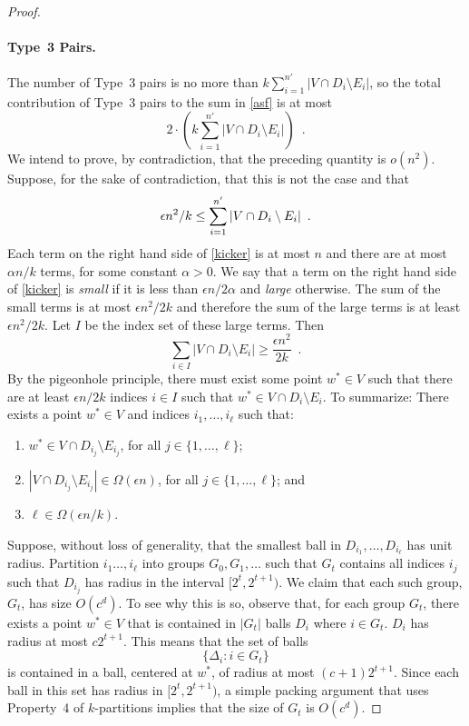\documentclass{patmorin}
\begin{document}
\begin{proof}
  \paragraph{Type~3 Pairs.}
  The number of Type~3 pairs is no more than $k\sum_{i=1}^{n'}|V\cap
  D_i\setminus E_i|$, so the total contribution of Type~3 pairs to 
  the sum in \eqref{asf} is at most
  \[
      2\cdot\left(k\sum_{i=1}^{n'} |V\cap D_i\setminus E_i|\right) \enspace .
  \]
  We intend to prove, by contradiction, that the preceding quantity
  is $o(n^2)$.  Suppose, for the sake of contradiction, that this is
  not the case and that
  \begin{equation}
    \epsilon n^2/k \le \sum_{i=1}^{n'} |V\cap D_i\setminus E_i| 
         \enspace . \eqlabel{kicker}
  \end{equation}
  Each term on the right hand side of \eqref{kicker} is at most $n$
  and there are at most $\alpha n/k$ terms, for some constant $\alpha
  >0$.  We say that a term on the right hand side of \eqref{kicker} is
  \emph{small} if it is less than $\epsilon n/2\alpha$ and \emph{large}
  otherwise.  The sum of the small terms is at most $\epsilon n^2/2k$
  and therefore the sum of the large terms is at least $\epsilon n^2/2k$.
  Let $I$ be the index set of these large terms.  Then
  \[
    \sum_{i\in I} |V\cap D_i\setminus E_i| \ge \frac{\epsilon n^2}{2k} \enspace .
  \]
  By the pigeonhole principle, there must exist some point $w^*\in V$
  such that there are at least $\epsilon n/2k$ indices $i\in I$ such
  that $w^*\in V\cap D_i\setminus E_i$.  To summarize: There exists a
  point $w^*\in V$ and indices $i_1,\ldots,i_\ell$ such that:
  \begin{enumerate}
     \item $w^*\in V\cap D_{i_j}\setminus E_{i_j}$, for all
        $j\in\{1,\ldots,\ell\}$;
     \item $|V\cap D_{i_j}\setminus E_{i_j}|\in \Omega(\epsilon n)$,
       for all $j\in\{1,\ldots,\ell\}$; and
     \item $\ell\in\Omega(\epsilon n/k)$.
  \end{enumerate}

  Suppose, without loss of generality, that the smallest ball
  in $D_{i_1},\ldots,D_{i_\ell}$ has unit radius.  Partition
  $i_1\ldots,i_\ell$ into groups $G_0,G_1,\ldots$ such that $G_t$
  contains all indices $i_j$ such that $D_{i_j}$ has radius in the
  interval $[2^t,2^{t+1})$.  We claim that each such group, $G_t$, has
  size $O(c^d)$.  To see why this is so, observe that, for each group
  $G_t$, there exists a point $w^*\in V$ that is contained in $|G_t|$
  balls $D_{i}$ where $i\in G_t$.  $D_{i}$ has radius at most $c2^{t+1}$.
  This means that the set of balls
  \[
     \{ \Delta_i : i\in G_t\}
  \]
  is contained in a ball, centered at $w^*$, of radius at most
  $(c+1)2^{t+1}$.  Since each ball in this set has radius in
  $[2^t,2^{t+1})$, a simple packing argument that uses Property~4 of
  $k$-partitions implies that the size of $G_t$ is $O(c^d)$.


\end{proof}
\end{document}
